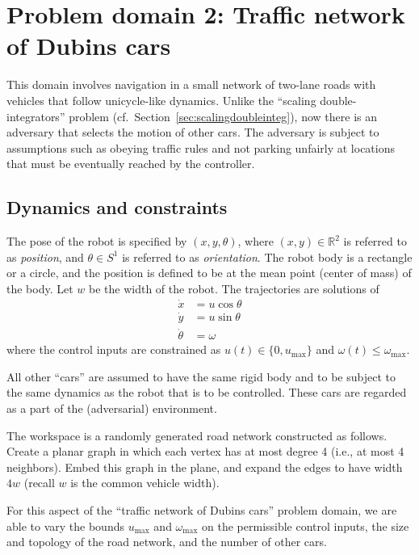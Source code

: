 \documentclass[12pt]{amsart}
\begin{document}
\section{Problem domain 2: Traffic network of Dubins cars}\label{sec:trafficdubins}

This domain involves navigation in a small network of two-lane roads with
vehicles that follow unicycle-like dynamics.  Unlike the ``scaling
double-integrators'' problem (cf.\ Section~\ref{sec:scalingdoubleinteg}), now
there is an adversary that selects the motion of other cars.  The adversary is
subject to assumptions such as obeying traffic rules and not parking unfairly at
locations that must be eventually reached by the controller.

\subsection{Dynamics and constraints}

The pose of the robot is specified by $(x,y,\theta)$, where $(x,y)\in
\mathbb{R}^2$ is referred to as \textit{position}, and $\theta\in S^1$ is
referred to as \textit{orientation}.  The robot body is a rectangle or a circle,
and the position is defined to be at the mean point (center of mass) of the
body.  Let $w$ be the width of the robot.  The trajectories are solutions of
\begin{align}
\dot{x} &= u \cos \theta \\
\dot{y} &= u \sin \theta \\
\dot{\theta} &= \omega
\end{align}
where the control inputs are constrained as $u(t)\in \{0,u_{\mathrm{max}}\}$ and
$\omega(t) \leq \omega_{\mathrm{max}}$.

All other ``cars'' are assumed to have the same rigid body and to be subject to
the same dynamics as the robot that is to be controlled.  These cars are
regarded as a part of the (adversarial) environment.

The workspace is a randomly generated road network constructed as follows.
Create a planar graph in which each vertex has at most degree 4 (i.e., at most 4
neighbors).  Embed this graph in the plane, and expand the edges to have width
$4w$ (recall $w$ is the common vehicle width).

For this aspect of the ``traffic network of Dubins cars'' problem domain, we are
able to vary the bounds $u_{\mathrm{max}}$ and $\omega_{\mathrm{max}}$ on the
permissible control inputs, the size and topology of the road network, and the
number of other cars.
\end{document}

